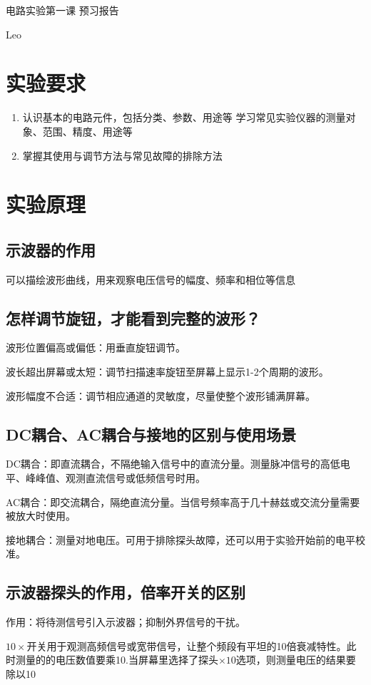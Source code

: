 \documentclass{ctexart}
\begin{document}
\begin{center}
    \LARGE{电路实验第一课 预习报告}
\end{center}
\begin{center}
    Leo
\end{center}
\section{实验要求}
\begin{enumerate}
    \item 认识基本的电路元件，包括分类、参数、用途等
    学习常见实验仪器的测量对象、范围、精度、用途等
    \item 掌握其使用与调节方法与常见故障的排除方法
\end{enumerate}

\section{实验原理}
\subsection{示波器的作用}
可以描绘波形曲线，用来观察电压信号的幅度、频率和相位等信息
\subsection{怎样调节旋钮，才能看到完整的波形？}
波形位置偏高或偏低：用垂直旋钮调节。

波长超出屏幕或太短：调节扫描速率旋钮至屏幕上显示1-2个周期的波形。

波形幅度不合适：调节相应通道的灵敏度，尽量使整个波形铺满屏幕。
\subsection{DC耦合、AC耦合与接地的区别与使用场景}
DC耦合：即直流耦合，不隔绝输入信号中的直流分量。测量脉冲信号的高低电平、峰峰值、观测直流信号或低频信号时用。

AC耦合：即交流耦合，隔绝直流分量。当信号频率高于几十赫兹或交流分量需要被放大时使用。

接地耦合：测量对地电压。可用于排除探头故障，还可以用于实验开始前的电平校准。
\subsection{示波器探头的作用，倍率开关的区别}
作用：将待测信号引入示波器；抑制外界信号的干扰。

$10\times $开关用于观测高频信号或宽带信号，让整个频段有平坦的10倍衰减特性。此时测量的的电压数值要乘10.当屏幕里选择了探头$\times 10 $选项，则测量电压的结果要除以10
\end{document}
